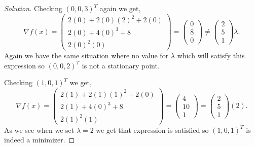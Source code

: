 \documentclass[12pt]{article}
\makeatletter
\theoremstyle{homework}
\newenvironment{exercise}[1]
{\def\@currentlabel{#1}\exercisecore}
{\endexercisecore}
\makeatother
\begin{document}
\begin{exercise}{2.1}
\begin{enumerate}
\begin{proof}[Solution]
      Checking $(0, 0, 3)^T$ again we get,
      \begin{equation*}
        \nabla f(x) = 
        \begin{pmatrix}
          2(0) + 2(0)(2)^2 + 2(0)\\
          2(0) + 4(0)^3 + 8\\
          2(0)^2(0)
        \end{pmatrix} =         \begin{pmatrix}
          0\\
          8\\
          0
        \end{pmatrix}
        \neq
        \begin{pmatrix}
          2\\
          5\\
          1
        \end{pmatrix}
        \lambda.
      \end{equation*}
      Again we have the same situation where no value for $\lambda$ which will satisfy this expression so
      $(0, 0, 2)^T$ is not a stationary point. 
      
      Checking $(1, 0, 1)^T$ we get, 
      \begin{equation*}
        \nabla f(x) = 
        \begin{pmatrix}
          2(1) + 2(1)(1)^2 + 2(0)\\
          2(1) + 4(0)^3 + 8\\
          2(1)^2(1)
        \end{pmatrix} =         \begin{pmatrix}
          4\\
          10\\
          1
        \end{pmatrix}
         = 
        \begin{pmatrix}
          2\\
          5\\
          1
        \end{pmatrix}
        (2).
      \end{equation*}
      As we see when we set $\lambda = 2$ we get that expression is satisfied so $(1, 0, 1)^T$ is indeed a minimizer. 

    \end{proof}
    \vspace{.15in}


\end{enumerate}
\end{exercise}
\end{document}
